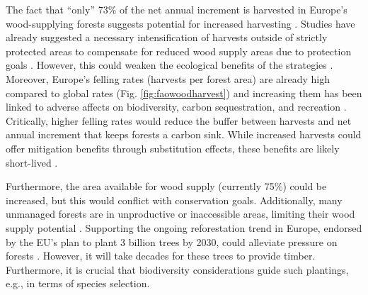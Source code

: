 \documentclass[]{article}
\begin{document}
The fact that ``only'' 73\% of the net annual increment is harvested in Europe's wood-supplying forests suggests potential for increased harvesting \parencite{FORESTEUROPE2020}.
Studies have already suggested a necessary intensification of harvests outside of strictly protected areas to compensate for reduced wood supply areas due to protection goals \parencite{PIKKARAINEN2024}. However, this could weaken the ecological benefits of the strategies \parencite{RATY2023}.
Moreover, Europe's felling rates (harvests per forest area) are already high compared to global rates (Fig. \ref{fig:faowoodharvest}) and increasing them has been linked to adverse affects on biodiversity, carbon sequestration, and recreation \parencite{Verkerk2014b, Soimakallio2021, Seppala2019, Schulte2022, Skytt2021, Makela2023}.
Critically, higher felling rates would reduce the buffer between harvests and net annual increment that keeps forests a carbon sink. While increased harvests could offer mitigation benefits through substitution effects, these benefits are likely short-lived \parencite{gregorQuantifyingImpactKey2024, BrunetNavarro2021, Harmon2019}.

Furthermore, the area available for wood supply (currently 75\%) could be increased, but this would conflict with conservation goals. Additionally, many unmanaged forests are in unproductive or inaccessible areas, limiting their wood supply potential \parencite{Verkerk2014b}.
Supporting the ongoing reforestation trend in Europe, endorsed by the EU's plan to plant 3 billion trees by 2030, could alleviate pressure on forests \parencite{FORESTEUROPE2020}. However, it will take decades for these trees to provide timber. Furthermore, it is crucial that biodiversity considerations guide such plantings, e.g., in terms of species selection.
\end{document}
